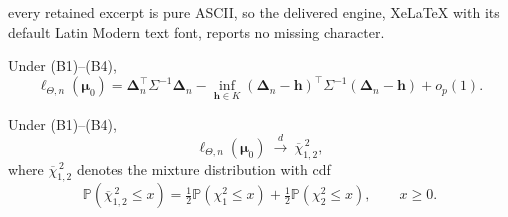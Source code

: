 \documentclass[10pt,a4paper]{amsart}
\newcommand{\Pp}{\mathbb{P}}
\newcommand{\barchi}[2]{\overline{\chi}^{\,2}_{#1,#2}}
\begin{document}
every retained excerpt is pure ASCII, so the delivered engine, XeLaTeX with its default Latin Modern text font, reports no missing character.
\begin{lemma}\label{lem:reduction}
Under (B1)--(B4),
\begin{equation}\label{eq:projection-reduction}
  \ell_{\Theta,n}(\boldsymbol{\mu}_0)
  =
  \boldsymbol{\Delta}_n^\top\Sigma^{-1}\boldsymbol{\Delta}_n
  -
  \inf_{\boldsymbol{h}\in K}
  (\boldsymbol{\Delta}_n-\boldsymbol{h})^\top\Sigma^{-1}(\boldsymbol{\Delta}_n-\boldsymbol{h})
  +o_{p}(1).
\end{equation}
\end{lemma}

\begin{theorem}\label{thm:fixed-boundary}
Under (B1)--(B4),
$$
  \ell_{\Theta,n}(\boldsymbol{\mu}_0)
  \ \xrightarrow{d}\
  \barchi{1}{2},
$$
where $\barchi{1}{2}$ denotes the mixture distribution with cdf
$$
  \Pp(\barchi{1}{2}\leq x)
  =
  \tfrac12\Pp(\chi^2_1\leq x)
  +
  \tfrac12\Pp(\chi^2_2\leq x),
  \qquad x\geq0.
$$
\end{theorem}
\end{document}
